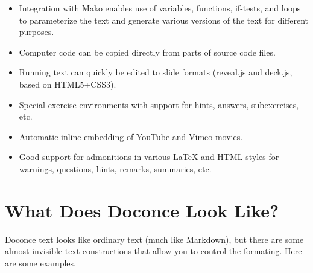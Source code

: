 \documentclass[%
oneside,                 %
final,                   %
10pt]{article}
\begin{document}
\begin{itemize}
 \item Integration with Mako enables use of variables, functions, if-tests,
   and loops to parameterize the text and generate various versions of
   the text for different purposes.

 \item Computer code can be copied directly from parts of source code files.

 \item Running text can quickly be edited to slide formats (reveal.js and deck.js,
   based on HTML5+CSS3).

 \item Special exercise environments with support for hints, answers,
   subexercises, etc.

 \item Automatic inline embedding of YouTube and Vimeo movies.

 \item Good support for admonitions in various {\LaTeX} and HTML styles
   for warnings, questions, hints, remarks, summaries, etc.
\end{itemize}

\noindent
\section{What Does Doconce Look Like?}

Doconce text looks like ordinary text (much like Markdown), but there
are some almost invisible text constructions that allow you to control
the formating. Here are some examples.
\end{document}
